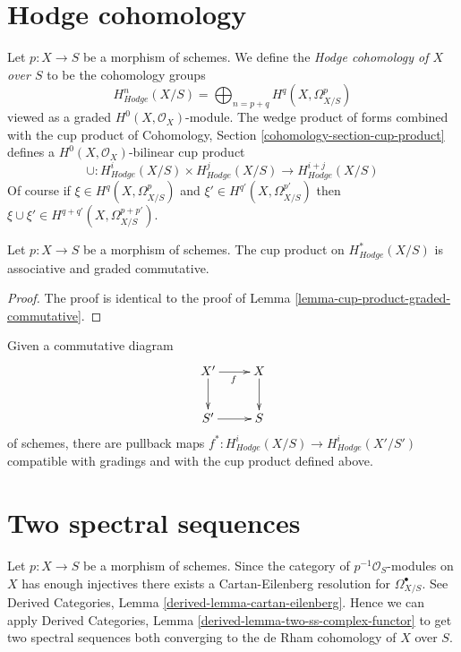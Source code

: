 \section{Hodge cohomology}
\label{section-hodge-cohomology}

\noindent
Let $p : X \to S$ be a morphism of schemes. We define the
{\it Hodge cohomology of $X$ over $S$} to be the cohomology groups
$$
H^n_{Hodge}(X/S) = \bigoplus\nolimits_{n = p + q} H^q(X, \Omega^p_{X/S})
$$
viewed as a graded $H^0(X, \mathcal{O}_X)$-module. The wedge product
of forms combined with the cup product of
Cohomology, Section \ref{cohomology-section-cup-product}
defines a $H^0(X, \mathcal{O}_X)$-bilinear cup product
$$
\cup :
H^i_{Hodge}(X/S) \times H^j_{Hodge}(X/S)
\longrightarrow
H^{i + j}_{Hodge}(X/S)
$$
Of course if $\xi \in H^q(X, \Omega^p_{X/S})$ and
$\xi' \in H^{q'}(X, \Omega^{p'}_{X/S})$ then $\xi \cup \xi' \in
H^{q + q'}(X, \Omega^{p + p'}_{X/S})$.

\begin{lemma}
\label{lemma-cup-product-hodge-graded-commutative}
Let $p : X \to S$ be a morphism of schemes.
The cup product on $H^*_{Hodge}(X/S)$ is associative and graded commutative.
\end{lemma}

\begin{proof}
The proof is identical to the proof of
Lemma \ref{lemma-cup-product-graded-commutative}.
\end{proof}

\noindent
Given a commutative diagram
$$
\xymatrix{
X' \ar[r]_f \ar[d] & X \ar[d] \\
S' \ar[r] & S
}
$$
of schemes, there are pullback maps
$f^* : H^i_{Hodge}(X/S) \longrightarrow H^i_{Hodge}(X'/S')$
compatible with gradings and with the cup product defined above.







\section{Two spectral sequences}
\label{section-hodge-to-de-rham}

\noindent
Let $p : X \to S$ be a morphism of schemes. Since the category
of $p^{-1}\mathcal{O}_S$-modules on $X$ has enough injectives
there exists a Cartan-Eilenberg resolution for $\Omega^\bullet_{X/S}$.
See Derived Categories, Lemma \ref{derived-lemma-cartan-eilenberg}.
Hence we can apply Derived Categories, Lemma
\ref{derived-lemma-two-ss-complex-functor} to get two spectral sequences
both converging to the de Rham cohomology of $X$ over $S$.

